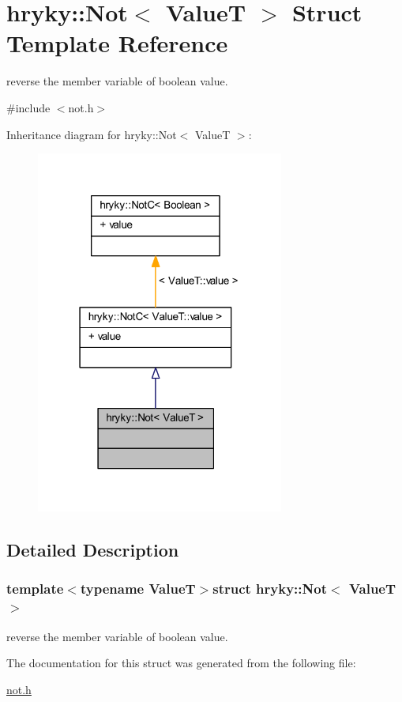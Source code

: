 \hypertarget{structhryky_1_1_not}{\section{hryky\-:\-:Not$<$ Value\-T $>$ Struct Template Reference}
\label{structhryky_1_1_not}
}


reverse the member variable of boolean value.  




{\ttfamily \#include $<$not.\-h$>$}



Inheritance diagram for hryky\-:\-:Not$<$ Value\-T $>$\-:\nopagebreak
\begin{figure}[H]
\begin{center}
\leavevmode
\includegraphics[width=231pt]{structhryky_1_1_not__inherit__graph}
\end{center}
\end{figure}


\subsection{Detailed Description}
\subsubsection*{template$<$typename Value\-T$>$struct hryky\-::\-Not$<$ Value\-T $>$}

reverse the member variable of boolean value. 

The documentation for this struct was generated from the following file\-:\begin{DoxyCompactItemize}
\item 
\hyperlink{not_8h}{not.\-h}\end{DoxyCompactItemize}
